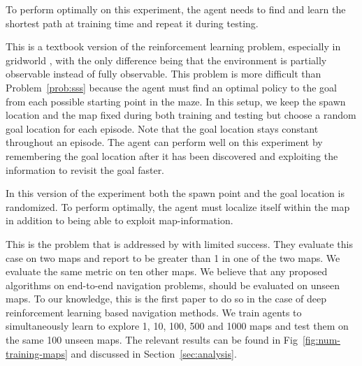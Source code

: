 \begin{description}
  \label{prob:sss}
  To perform optimally on this experiment, the agent needs to find and learn the shortest path at training time and repeat it during testing. 

  This is a textbook version of the reinforcement learning problem, especially in gridworld \cite{SuBaBOOK1998}, with the only difference being that the environment is partially observable instead of fully observable.
  This problem is more difficult than Problem~\ref{prob:sss} because the agent
  must find an optimal policy to the goal from each possible starting point in the maze.
  In this setup, we keep the spawn location and the map fixed during both training and testing but choose a random goal location for each episode.
  Note that the goal location stays constant throughout an episode.
  The agent can perform well on this experiment by remembering the goal location after it has been discovered and exploiting the information to revisit the goal faster.  
  
  In this version of the experiment both the spawn point and the goal location is randomized. To perform optimally, the agent must localize itself within the map in addition to being able to exploit map-information.
  
  This is the problem that is addressed by \cite{MiPaViICLR2017} with limited success. 
  They evaluate this case on two maps and report \LatencyOneGtOne{} to be greater than 1 in one of the two maps. We evaluate the same metric on ten other maps.
    We believe that any proposed algorithms on end-to-end navigation problems, should be evaluated on unseen maps.
    To our knowledge, this is the first paper to do so in the case of deep reinforcement learning based navigation methods.
    We train agents to simultaneously learn to explore 1, 10, 100, 500 and 1000 maps and test them on the same 100 unseen maps. The relevant results can be found in Fig~\ref{fig:num-training-maps} and discussed in Section~\ref{sec:analysis}. 
\end{description}

